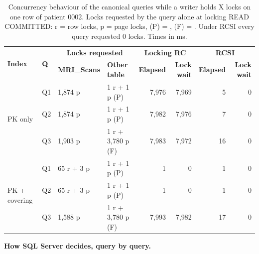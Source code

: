 \begin{table}[H]
\centering
\caption{Concurrency behaviour of the canonical queries while a writer holds X locks on one row of patient 0002. Locks requested by the query alone at locking READ COMMITTED: r = row locks, p = page locks, (P) = , (F) = . Under RCSI every query requested 0 locks. Times in ms.}
\label{tab:r5-queries}
\small
\setlength{\tabcolsep}{4pt}
\begin{tabular}{llllrrrr}
\toprule
\multirow{2}{*}{\textbf{Index}} & \multirow{2}{*}{\textbf{Q}} & \multicolumn{2}{c}{\textbf{Locks requested}} & \multicolumn{2}{c}{\textbf{Locking RC}} & \multicolumn{2}{c}{\textbf{RCSI}} \\
 & & \textbf{MRI\_Scans} & \textbf{Other table} & \textbf{Elapsed} & \textbf{Lock wait} & \textbf{Elapsed} & \textbf{Lock wait} \\
\midrule
\multirow{3}{*}{PK only}
 & Q1 & 1{,}874 p & 1 r + 1 p (P) & 7{,}976 & 7{,}969 & 5  & 0 \\
 & Q2 & 1{,}874 p & 1 r + 1 p (P) & 7{,}982 & 7{,}976 & 7  & 0 \\
 & Q3 & 1{,}903 p & 1 r + 3{,}780 p (F) & 7{,}983 & 7{,}972 & 16 & 0 \\
\midrule
\multirow{3}{*}{PK + covering}
 & Q1 & 65 r + 3 p & 1 r + 1 p (P) & 1 & 0 & 1  & 0 \\
 & Q2 & 65 r + 3 p & 1 r + 1 p (P) & 1 & 0 & 1  & 0 \\
 & Q3 & 1{,}588 p & 1 r + 3{,}780 p (F) & 7{,}993 & 7{,}982 & 17 & 0 \\
\bottomrule
\end{tabular}
\end{table}

\textbf{How SQL Server decides, query by query.}

